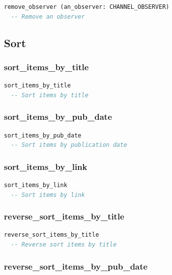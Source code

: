 \begin{lstlisting}[language=Eiffel]
remove_observer (an_observer: CHANNEL_OBSERVER)
  -- Remove an observer
\end{lstlisting}

\subsection{Sort}
\label{sec:channel-sort}

\subsubsection{sort\_items\_by\_title}

\begin{lstlisting}[language=Eiffel]
sort_items_by_title
  -- Sort items by title
\end{lstlisting}

\subsubsection{sort\_items\_by\_pub\_date}

\begin{lstlisting}[language=Eiffel]
sort_items_by_pub_date
  -- Sort items by publication date
\end{lstlisting}

\subsubsection{sort\_items\_by\_link}

\begin{lstlisting}[language=Eiffel]
sort_items_by_link
  -- Sort items by link
\end{lstlisting}

\subsubsection{reverse\_sort\_items\_by\_title}

\begin{lstlisting}[language=Eiffel]
reverse_sort_items_by_title
  -- Reverse sort items by title
\end{lstlisting}

\subsubsection{reverse\_sort\_items\_by\_pub\_date}

